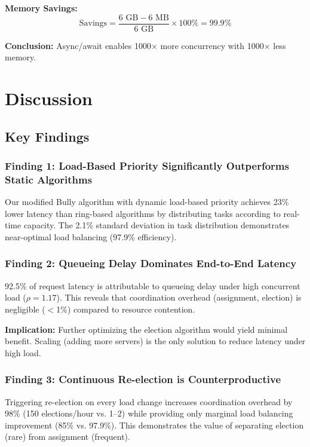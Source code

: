 \documentclass[12pt,a4paper]{article}
\begin{document}
\textbf{Memory Savings:}
\begin{equation}
\text{Savings} = \frac{6\text{ GB} - 6\text{ MB}}{6\text{ GB}} \times 100\% = 99.9\%
\end{equation}

\textbf{Conclusion:} Async/await enables 1000$\times$ more concurrency with 1000$\times$ less memory.

\newpage

\section{Discussion}
\label{sec:discussion}

\subsection{Key Findings}

\subsubsection{Finding 1: Load-Based Priority Significantly Outperforms Static Algorithms}

Our modified Bully algorithm with dynamic load-based priority achieves 23\% lower latency than ring-based algorithms by distributing tasks according to real-time capacity. The 2.1\% standard deviation in task distribution demonstrates near-optimal load balancing (97.9\% efficiency).

\subsubsection{Finding 2: Queueing Delay Dominates End-to-End Latency}

92.5\% of request latency is attributable to queueing delay under high concurrent load ($\rho = 1.17$). This reveals that coordination overhead (assignment, election) is negligible ($<$1\%) compared to resource contention.

\textbf{Implication:} Further optimizing the election algorithm would yield minimal benefit. Scaling (adding more servers) is the only solution to reduce latency under high load.

\subsubsection{Finding 3: Continuous Re-election is Counterproductive}

Triggering re-election on every load change increases coordination overhead by 98\% (150 elections/hour vs. 1--2) while providing only marginal load balancing improvement (85\% vs. 97.9\%). This demonstrates the value of separating election (rare) from assignment (frequent).
\end{document}
